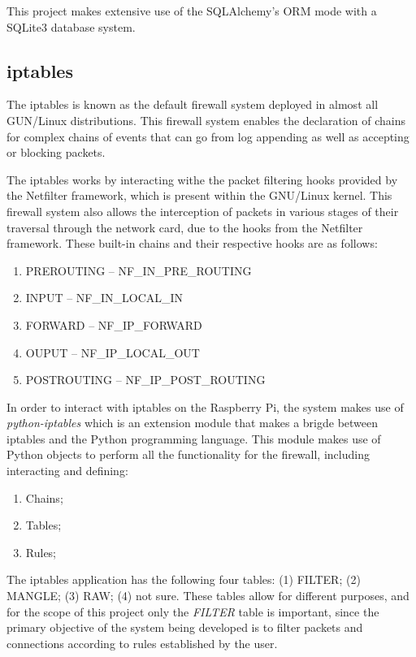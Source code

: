 This project makes extensive use of the SQLAlchemy's ORM mode with a SQLite3
database system.

\subsection{iptables}
\label{chap3:sec:tools:sub:iptables}
The iptables is known as the default firewall system deployed in almost all
GUN/Linux distributions. This firewall system enables the declaration of chains
for complex chains of events that can go from log appending as well as accepting
or blocking packets.

The iptables works by interacting withe the packet filtering hooks provided by
the Netfilter framework, which is present within the GNU/Linux kernel.
This firewall system also allows the interception of packets in various stages
of their traversal through the network card, due to the hooks from the Netfilter
framework. These built-in chains and their
respective hooks are as follows:
\begin{enumerate}
	\item PREROUTING -- NF\_IN\_PRE\_ROUTING
	\item INPUT -- NF\_IN\_LOCAL\_IN
	\item FORWARD -- NF\_IP\_FORWARD
	\item OUPUT -- NF\_IP\_LOCAL\_OUT
	\item POSTROUTING -- NF\_IP\_POST\_ROUTING
\end{enumerate}

In order to interact with iptables on the Raspberry Pi, the system makes use of
\emph{python-iptables} which is an extension module that makes a brigde between
iptables and the Python programming language.
This module makes use of Python objects to perform all the functionality for the
firewall, including interacting and defining:
\begin{enumerate}
	\item Chains;
	\item Tables;
	\item Rules;
\end{enumerate}

The iptables application has the following four tables: (1) FILTER; (2) MANGLE;
(3) RAW; (4) not sure. These tables allow for different purposes, and for the
scope of this project only the \emph{FILTER} table is important, since the
primary objective of the system being developed is to filter packets and
connections according to rules established by the user.

